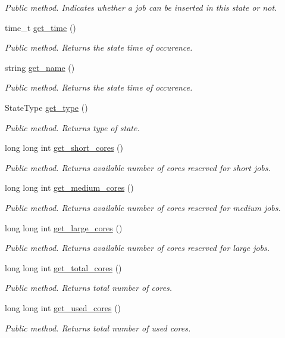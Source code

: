 \begin{DoxyCompactItemize}
\begin{DoxyCompactList}\small\item\em Public method. Indicates whether a job can be inserted in this state or not. \end{DoxyCompactList}\item 
time\+\_\+t \hyperlink{classState_a5fa477c55eb40f020372974f84b7a5e6}{get\+\_\+time} ()
\begin{DoxyCompactList}\small\item\em Public method. Returns the state time of occurence. \end{DoxyCompactList}\item 
string \hyperlink{classState_ae179223944551fda8ffadbde68972a4f}{get\+\_\+name} ()
\begin{DoxyCompactList}\small\item\em Public method. Returns the state time of occurence. \end{DoxyCompactList}\item 
State\+Type \hyperlink{classState_a59a20bf57d4ffb9748cbf3b1c051c071}{get\+\_\+type} ()
\begin{DoxyCompactList}\small\item\em Public method. Returns type of state. \end{DoxyCompactList}\item 
long long int \hyperlink{classState_a29689f616cf6fca4c07b5a7952c324a4}{get\+\_\+short\+\_\+cores} ()
\begin{DoxyCompactList}\small\item\em Public method. Returns available number of cores reserved for short jobs. \end{DoxyCompactList}\item 
long long int \hyperlink{classState_a6f260fbc2e8cf6ffeb9249808e07c525}{get\+\_\+medium\+\_\+cores} ()
\begin{DoxyCompactList}\small\item\em Public method. Returns available number of cores reserved for medium jobs. \end{DoxyCompactList}\item 
long long int \hyperlink{classState_a97489ea52b70c2a2630ce80655c94d16}{get\+\_\+large\+\_\+cores} ()
\begin{DoxyCompactList}\small\item\em Public method. Returns available number of cores reserved for large jobs. \end{DoxyCompactList}\item 
long long int \hyperlink{classState_a3b5789fd6d375e09066b3119f994a536}{get\+\_\+total\+\_\+cores} ()
\begin{DoxyCompactList}\small\item\em Public method. Returns total number of cores. \end{DoxyCompactList}\item 
long long int \hyperlink{classState_a3be179b26f26137117e2e303d7b1bbdc}{get\+\_\+used\+\_\+cores} ()
\begin{DoxyCompactList}\small\item\em Public method. Returns total number of used cores. \end{DoxyCompactList}\end{DoxyCompactItemize}
